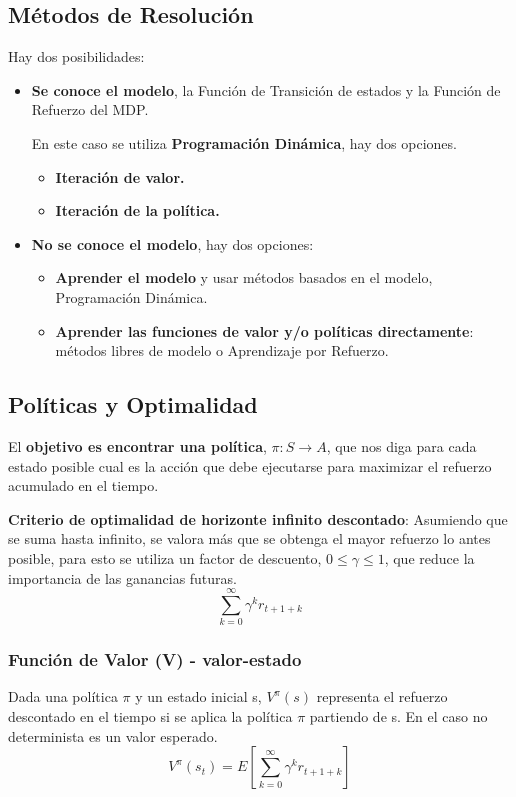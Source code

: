 \documentclass[12pt]{report} %
\begin{document}
\subsection{Métodos de Resolución}
Hay dos posibilidades:
\begin{itemize}
  \item \textbf{Se conoce el modelo}, la Función de Transición de estados y la Función de Refuerzo del MDP.
  
  En este caso se utiliza \textbf{Programación Dinámica}, hay dos opciones.
  \begin{itemize}
    \item \textbf{Iteración de valor.}
    \item \textbf{Iteración de la política.}
  \end{itemize}

  \item \textbf{No se conoce el modelo}, hay dos opciones:
  \begin{itemize}
    \item \textbf{Aprender el modelo} y usar métodos basados en el modelo, Programación Dinámica.
    \item \textbf{Aprender las funciones de valor y/o políticas directamente}: métodos libres de modelo o Aprendizaje por Refuerzo.
  \end{itemize}
\end{itemize}

\subsection{Políticas y Optimalidad}

El \textbf{objetivo es encontrar una política}, $\pi: S \rightarrow A$, que nos diga para cada estado posible cual es la acción que debe ejecutarse para maximizar el refuerzo acumulado en el tiempo.

\textbf{Criterio de optimalidad de horizonte infinito descontado}: Asumiendo que se suma hasta infinito, se valora más que se obtenga el mayor refuerzo lo antes posible, para esto se utiliza un factor de descuento, $0 \leq \gamma \leq 1$, que reduce la importancia de las ganancias futuras.
$$\sum ^\infty _{k=0} \gamma^k r_{t+1+k}$$

\newpage

\subsubsection{Función de Valor (V) - valor-estado}
Dada una política $\pi$ y un estado inicial s, $V^\pi (s)$ representa el refuerzo descontado en el tiempo si se aplica la política $\pi$ partiendo de s. En el caso no determinista es un valor esperado.
$$V^\pi(s_t)=E \left[ \sum ^\infty _{k=0} \gamma^k r_{t+1+k} \right]$$
\end{document}
